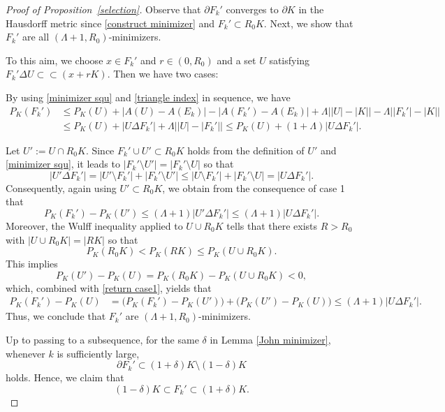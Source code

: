\documentclass[reqno,11pt]{amsart}
\numberwithin{equation}{section}
\theoremstyle{remark}
\begin{document}
\begin{proof}[Proof of Proposition~\ref{selection}]
    Observe that $\partial F_k'$ converges to $\partial K$ in the Hausdorff metric since \eqref{construct minimizer} and $F_k'\subset R_0 K $. Next, we show that  $F_k'$ are all $(\Lambda+1, R_0)$-minimizers.  

    To this aim, we choose $x\in F_k'$ and $r\in(0, R_0)$  and a set $U$ satisfying
    $F_k'\Delta U\subset\subset (x+rK)$. Then we have two cases:

\medskip
{} 
By using \eqref{minimizer squ} and \eqref{triangle index} in sequence,  we have
\begin{align}\label{ezr minimizer}
    P_K(F_k')& \le P_K(U)+\big|A(U)-A(E_k)\big|-\big|A(F_k')-A(E_k)\big|+\Lambda\big||U|-|K|\big|-\Lambda\big||F_k'|-|K|\big|
    \nonumber\\
    & \le P_K(U)+|U\Delta F_k'|+\Lambda\big||U|-|F_k'|\big|\le P_K(U)+(1+\Lambda)|U\Delta F_k'|.
\end{align}

\medskip
{} 
Let $U':=U\cap R_0 K$. Since $F_k'\cup U'\subset R_0 K$ holds from the definition of $U'$ and \eqref{minimizer squ}, it leads to $|F_k'\setminus U'|=|F_k'\setminus U|$ so that 
$$|U'\Delta F_k'|= |U'\setminus F_k'|+|F_k'\setminus U'|\le |U\setminus F_k'|+|F_k'\setminus U|= |U\Delta F_k'|.$$
Consequently, again using $U'\subset R_0 K$,  we obtain from the consequence of case 1 that  
\begin{equation}\label{return case1}
        P_K(F_k')-P_K(U')\le  (\Lambda+1)|U'\Delta F_k'|\le (\Lambda+1)|U\Delta F_k'|.
\end{equation}
Moreover, the  Wulff inequality applied to $U\cup R_0 K$ tells that  there exists  $R>R_0$ with $|U\cup R_0 K|=|R K|$ so that 
\begin{equation}\label{iso estimate}
    P_K(R_0 K)< P_K(R K)\le P_K(U\cup R_0 K).
\end{equation}
This implies
$$P_K(U')-P_K(U)=P_K(R_0 K)-P_K(U\cup R_0 K)< 0,$$
 which, combined with \eqref{return case1}, yields that 
 \begin{align}\label{ezr minimizer 2}
     P_K(F_k')-P_K(U)& =\big(P_K(F_k')-P_K(U')\big)+\big(P_K(U')-P_K(U)\big)\le (\Lambda+1)|U\Delta F_k'|.
 \end{align}
 Thus, we conclude that $F_k'$ are $(\Lambda+1,R_0)$-minimizers.

\medskip
  Up to passing to a subsequence, for the same  $\delta$ in Lemma \ref{John minimizer}, whenever $k$ is sufficiently large,
 \begin{equation}\label{boundary near K}
     \partial F_k'\subset (1+\delta) K\setminus (1-\delta)K
 \end{equation}
 holds. Hence, we claim that 
 \begin{equation}\label{nearly K}
     (1-\delta)K\subset F_k'\subset (1+\delta) K.
 \end{equation} 
 

\end{proof}
\end{document}
